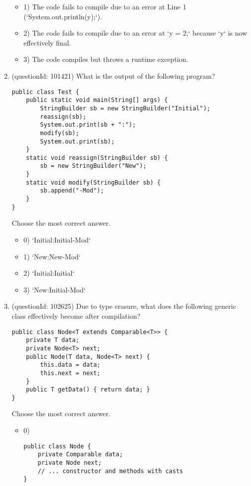 \documentclass[12pt]{article}
\begin{document}
\begin{enumerate}[label=(\arabic*)]
\begin{itemize}
\item 1) The code fails to compile due to an error at Line 1 (`System.out.println(y);`).

\item 2) The code fails to compile due to an error at `y = 2;` because `y` is now effectively final.

\item 3) The code compiles but throws a runtime exception.

\end{itemize}
\item (questionId: 101421) What is the output of the following program?
\begin{verbatim}
public class Test {
    public static void main(String[] args) {
        StringBuilder sb = new StringBuilder("Initial");
        reassign(sb);
        System.out.print(sb + ":");
        modify(sb);
        System.out.print(sb);
    }
    static void reassign(StringBuilder sb) {
        sb = new StringBuilder("New");
    }
    static void modify(StringBuilder sb) {
        sb.append("-Mod");
    }
}
\end{verbatim}
Choose the most correct answer. 
\begin{itemize}
\item 0) `Initial:Initial-Mod`

\item 1) `New:New-Mod`

\item 2) `Initial:Initial`

\item 3) `New:Initial-Mod`

\end{itemize}
\item (questionId: 102625) Due to type erasure, what does the following generic class effectively become after compilation?\begin{verbatim}
public class Node<T extends Comparable<T>> {
    private T data;
    private Node<T> next;
    public Node(T data, Node<T> next) {
        this.data = data;
        this.next = next;
    }
    public T getData() { return data; }
}
\end{verbatim}
Choose the most correct answer. 
\begin{itemize}
\item 0) \begin{verbatim}public class Node {
    private Comparable data;
    private Node next;
    // ... constructor and methods with casts
}\end{verbatim}


\end{itemize}
\end{enumerate}
\end{document}
